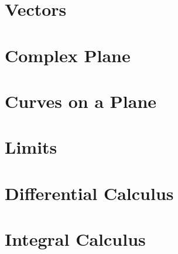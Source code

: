 \documentclass{mext-rev}
\begin{document}
\section{Vectors}\label{vec}\lipsum[2]
\section{Complex Plane}\label{cmplx}\lipsum[2]
\section{Curves on a Plane}\label{curves}\lipsum[2]
\section{Limits}\label{lim}\lipsum[2]
\section{Differential Calculus}\label{diffcalc}\lipsum[2]
\section{Integral Calculus}\label{intcalc}\lipsum[2]
\end{document}
